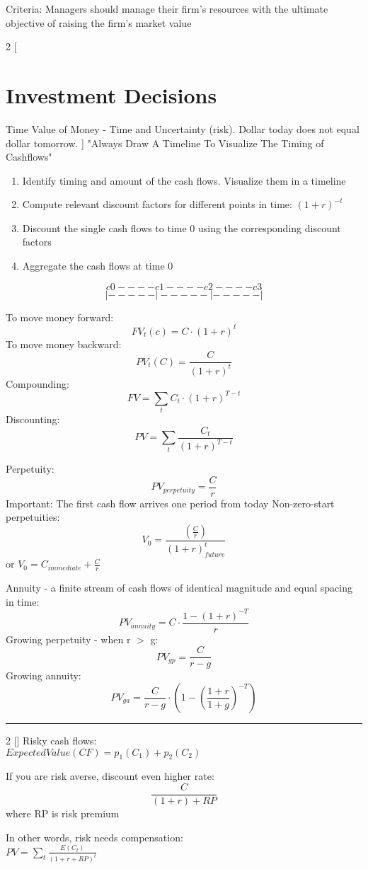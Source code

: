 \documentclass[8pt]{report}
\begin{document}
Criteria: Managers should manage their firm’s resources with the
ultimate objective of raising the firm’s market value

\begin{multicols}{2}
[
\section{Investment Decisions}
Time Value of Money - Time and Uncertainty (risk). Dollar today does not equal dollar tomorrow.
]
"Always Draw A Timeline To Visualize The Timing of Cashflows"
\begin{enumerate}
\item Identify timing and amount of the cash flows. Visualize them in a
timeline
\item Compute relevant discount factors for different points in time: $(1 + r)^{-t}$
\item Discount the single cash flows to time 0 using the corresponding
discount factors
\item Aggregate the cash flows at time 0
\end{enumerate}

$$c0----c1----c2----c3$$
$$|-----|-----|-----|$$


To move money forward: $$FV_t(c) = C \cdot (1+r)^t$$ 
To move money backward: $$PV_t(C) = \frac{C}{(1+r)^t}$$
Compounding: $$FV = \sum_t C_t \cdot (1+r)^{T-t}$$
Discounting: $$PV = \sum_t \frac{C_t}{(1+r)^{T-t}}$$

Perpetuity: $$PV_{perpetuity} = \frac{C}{r}$$
Important: The first cash flow arrives one period from today
Non-zero-start perpetuities: $$V_0 = \frac{(\frac{C}{r})}{(1+r)^t_{future}}$$ or $V_0 = C_{immediate} + \frac{C}{r}$

Annuity - a finite stream of cash flows of identical
magnitude and equal spacing in time: $$ PV_{annuity} = C \cdot \frac{1-(1+r)^{-T}}{r} $$
Growing perpetuity - when r $>$ g: $$ PV_{gp} = \frac{C}{r-g} $$
Growing annuity: $$ PV_{ga} = \frac{C}{r-g} \cdot (1 - (\frac{1+r}{1+g})^{-T}) $$ 
\end{multicols}
\hrule
\begin{multicols}{2}
[] 
Risky cash flows: \\
$ExpectedValue(CF) = p_1(C_1) + p_2(C_2)$

If you are risk averse, discount even higher rate: \\
$$\frac{C}{(1+r)+RP}$$ where RP is risk premium

In other words, risk needs compensation: \\
$PV = \sum_t \frac{E(C_t)}{(1+r+RP)^t}$

\end{multicols}
\end{document}
